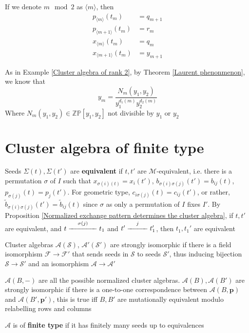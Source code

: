 \documentclass[main]{subfiles}
\begin{document}
\begin{note}
If we denote $m\mod 2$ as $\langle m\rangle$, then
\begin{align*}
p_{\langle m\rangle}(t_m)&=q_{m+1} \\
p_{\langle m+1\rangle}(t_m)&=r_m \\
x_{\langle m\rangle}(t_m)&=q_m \\
x_{\langle m+1\rangle}(t_m)&=y_{m+1}
\end{align*}
\end{note}

\begin{example}
As in Example \ref{Cluster algebra of rank 2}, by Theorem \ref{Laurent phenonmenon}, we know that
\[y_m=\frac{N_m(y_1,y_2)}{y_1^{d_1(m)}y_2^{d_2(m)}}\]
Where $N_m(y_1,y_2)\in\mathbb {ZP}[y_1,y_2]$ not divisible by $y_1$ or $y_2$
\end{example}



\section{Cluster algebra of finite type}

\begin{definition}
Seeds $\Sigma(t),\Sigma(t')$ are \textbf{equivalent} if $t,t'$ are $\mathcal M$-equivalent, i.e. there is a permutation $\sigma$ of $I$ such that $x_{\sigma(i)(t)}=x_{i}(t')$, 
$b_{\sigma(i)\sigma(j)}(t')=b_{ij}(t)$, $p_{\sigma(j)}(t)=p_j(t')$. For geometric type, $c_{i\sigma(j)}(t)=c_{ij}(t')$, or rather, $\tilde b_{\sigma(i)\sigma(j)}(t')=\tilde b_{ij}(t)$ since $\sigma$ as only a permutation of $I$ fixes $I'$. By Proposition \ref{Normalized exchange pattern determines the cluster algebra}, if $t,t'$ are equivalent, and $t\xedge{\sigma(j)}t_1$ and $t'\xedge{j}t_1'$, then $t_1,t_1'$ are equivalent \par
Cluster algebras $\mathcal A(\mathcal S)$, $\mathcal A'(\mathcal S')$ are strongly isomorphic if there is a field isomorphism $\mathcal F\to\mathcal F'$ that sends seeds in $\mathcal S$ to seeds $\mathcal S'$, thus inducing bijection $\mathcal S\to\mathcal S'$ and an isomorphism $\mathcal A\to\mathcal A'$ \par
$\mathcal A(B,-)$ are all the possible normalized cluster algebras. $\mathcal A(B),\mathcal A(B')$ are strongly isomorphic if there is a one-to-one correspondence between $\mathcal A(B,\mathbf p)$ and $\mathcal A(B',\mathbf p')$, this is true iff $B,B'$ are mutationally equivalent modulo relabelling rows and columns \par
$\mathcal A$ is of \textbf{finite type} if it has finitely many seeds up to equivalences
\end{definition}
\end{document}
